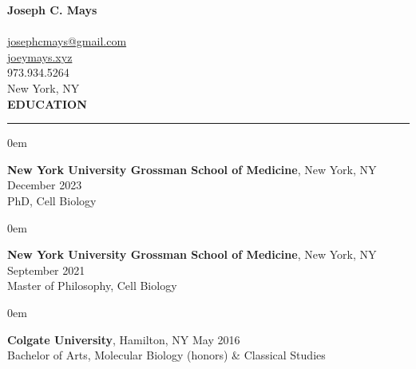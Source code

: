 \documentclass[10pt, letterpaper]{article} %
\newenvironment{CVSection}{
\begin{addmargin}[2em]{0em}
\begin{samepage}}
{\end{samepage}
\end{addmargin}\bigskip}
\newcommand{\CVHeading}[1]{
\MakeUppercase{\bf #1}
\smallskip
\hrule
\medskip
}
\begin{document}
{\Huge\textbf{Joseph C. Mays}}\\\\
\faEnvelopeSquare\hspace{2.3 mm}\href{mailto:josephcmays+CV@gmail.com}{josephcmays@gmail.com}\\
\faGlobe\hspace{2.3 mm}\href{https://joeymays.xyz}{joeymays.xyz}\\ 
\faPhone\hspace{2.4 mm}973.934.5264\\
\faHome\hspace{2 mm}New York, NY\\

\CVHeading{Education}
\begin{CVSection}
\textbf{New York University Grossman School of Medicine}, New York, NY \hfill December 2023\\
PhD, Cell Biology
\end{CVSection}
\begin{CVSection}
\textbf{New York University Grossman School of Medicine}, New York, NY \hfill September 2021\\
Master of Philosophy, Cell Biology
\end{CVSection}
\begin{CVSection}
\textbf{Colgate University}, Hamilton, NY \hfill May 2016\\
Bachelor of Arts, Molecular Biology (honors) \& Classical Studies
\end{CVSection}
\end{document}
